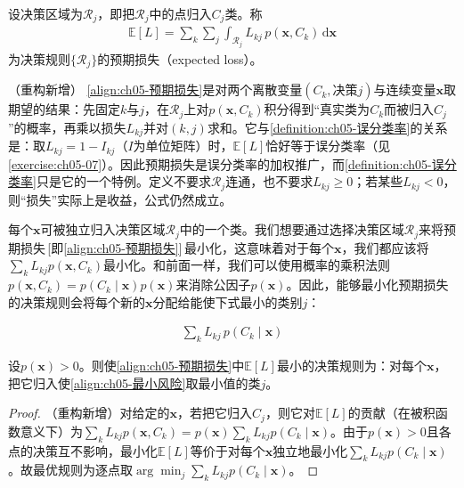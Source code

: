 \documentclass[../../main.tex]{subfiles}
\begin{document}
\begin{definition}[预期损失]\label{definition:ch05-预期损失}
设决策区域为$\mathcal{R}_j$，即把$\mathcal{R}_j$中的点归入$C_j$类。称
\begin{align}
  \mathbb{E}[L]=\sum_{k}\sum_{j}\int_{\mathcal{R}_j}L_{kj}\,p(\boldsymbol{x},C_k)\,\mathrm{d}\boldsymbol{x}
  \label{align:ch05-预期损失}
\end{align}
为决策规则$\{\mathcal{R}_j\}$的预期损失（expected loss）。
\end{definition}

\begin{remark}（重构新增）
\eqref{align:ch05-预期损失}是对两个离散变量$(C_k,\text{决策}j)$与连续变量$\boldsymbol{x}$取期望的结果：先固定$k$与$j$，在$\mathcal{R}_j$上对$p(\boldsymbol{x},C_k)$积分得到“真实类为$C_k$而被归入$C_j$”的概率，再乘以损失$L_{kj}$并对$(k,j)$求和。它与\cref{definition:ch05-误分类率}的关系是：取$L_{kj}=1-I_{kj}$（$I$为单位矩阵）时，$\mathbb{E}[L]$恰好等于误分类率（见\cref{exercise:ch05-07}）。因此预期损失是误分类率的加权推广，而\cref{definition:ch05-误分类率}只是它的一个特例。定义不要求$\mathcal{R}_j$连通，也不要求$L_{kj}\geqslant 0$；若某些$L_{kj}<0$，则“损失”实际上是收益，公式仍然成立。
\end{remark}

每个$\boldsymbol{x}$可被独立归入决策区域$\mathcal{R}_j$中的一个类。我们想要通过选择决策区域$\mathcal{R}_j$来将预期损失\,[即\eqref{align:ch05-预期损失}]\,最小化，这意味着对于每个$\boldsymbol{x}$，我们都应该将$\sum_k L_{kj}p(\boldsymbol{x},C_k)$最小化。和前面一样，我们可以使用概率的乘积法则$p(\boldsymbol{x},C_k)=p(C_k\mid\boldsymbol{x})p(\boldsymbol{x})$来消除公因子$p(\boldsymbol{x})$。因此，能够最小化预期损失的决策规则会将每个新的$\boldsymbol{x}$分配给能使下式最小的类别$j$：

\begin{align}
  \sum_{k}L_{kj}\,p(C_k\mid\boldsymbol{x})
  \label{align:ch05-最小风险}
\end{align}

\begin{proposition}[最小预期损失决策规则]\label{proposition:ch05-最小风险规则}
设$p(\boldsymbol{x})>0$。则使\eqref{align:ch05-预期损失}中$\mathbb{E}[L]$最小的决策规则为：对每个$\boldsymbol{x}$，把它归入使\eqref{align:ch05-最小风险}取最小值的类$j$。
\end{proposition}

\begin{proof}
（重构新增）对给定的$\boldsymbol{x}$，若把它归入$C_j$，则它对$\mathbb{E}[L]$的贡献（在被积函数意义下）为$\sum_k L_{kj}p(\boldsymbol{x},C_k)=p(\boldsymbol{x})\sum_k L_{kj}p(C_k\mid\boldsymbol{x})$。由于$p(\boldsymbol{x})>0$且各点的决策互不影响，最小化$\mathbb{E}[L]$等价于对每个$\boldsymbol{x}$独立地最小化$\sum_k L_{kj}p(C_k\mid\boldsymbol{x})$。故最优规则为逐点取$\arg\min_j\sum_k L_{kj}p(C_k\mid\boldsymbol{x})$。
\end{proof}
\end{document}
